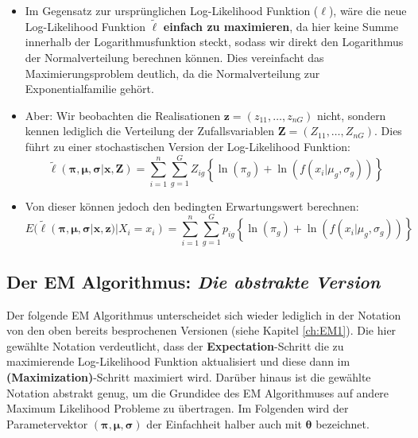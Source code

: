 \documentclass[
  ngerman,
]{book}
\begin{document}
\begin{itemize}
\item
  Im Gegensatz zur ursprünglichen Log-Likelihood Funktion (\(\ell\)), wäre die neue Log-Likelihood Funktion \(\tilde\ell\) \textbf{einfach zu maximieren}, da hier keine Summe innerhalb der Logarithmusfunktion steckt, sodass wir direkt den Logarithmus der Normalverteilung berechnen können. Dies vereinfacht das Maximierungsproblem deutlich, da die Normalverteilung zur Exponentialfamilie gehört.
\item
  Aber: Wir beobachten die Realisationen \(\mathbf{z}=(z_{11},\dots,z_{nG})\) nicht, sondern kennen lediglich die Verteilung der Zufallsvariablen \(\mathbf{Z}=(Z_{11},\dots,Z_{nG})\). Dies führt zu einer stochastischen Version der Log-Likelihood Funktion:
  \[
  \tilde{\ell}(\boldsymbol{\pi},\boldsymbol{\mu},\boldsymbol{\sigma}|\mathbf{x},\mathbf{Z})=\sum_{i=1}^n\sum_{g=1}^GZ_{ig}\left\{\ln\left(\pi_g\right)+\ln\left(f(x_i|\mu_g,\sigma_g)\right)\right\}
  \]
\item
  Von dieser können jedoch den bedingten Erwartungswert berechnen:
  \[
  E(\tilde{\ell}(\boldsymbol{\pi},\boldsymbol{\mu},\boldsymbol{\sigma}|\mathbf{x},\mathbf{z})|X_i=x_i)=\sum_{i=1}^n\sum_{g=1}^Gp_{ig}\left\{\ln\left(\pi_g\right)+\ln\left(f(x_i|\mu_g,\sigma_g)\right)\right\}
  \]
\end{itemize}

\hypertarget{ch:EM2}{%
\subsection{\texorpdfstring{Der EM Algorithmus: \emph{Die abstrakte Version}}{Der EM Algorithmus: Die abstrakte Version}}\label{ch:EM2}}

Der folgende EM Algorithmus unterscheidet sich wieder lediglich in der Notation von den oben bereits besprochenen Versionen (siehe Kapitel \ref{ch:EM1}). Die hier gewählte Notation verdeutlicht, dass der \textbf{Expectation}-Schritt die zu maximierende Log-Likelihood Funktion aktualisiert und diese dann im \textbf{(Maximization)}-Schritt maximiert wird. Darüber hinaus ist die gewählte Notation abstrakt genug, um die Grundidee des EM Algorithmuses auf andere Maximum Likelihood Probleme zu übertragen. Im Folgenden wird der Parametervektor \((\boldsymbol{\pi},\boldsymbol{\mu},\boldsymbol{\sigma})\) der Einfachheit halber auch mit \(\boldsymbol{\theta}\) bezeichnet.
\end{document}
